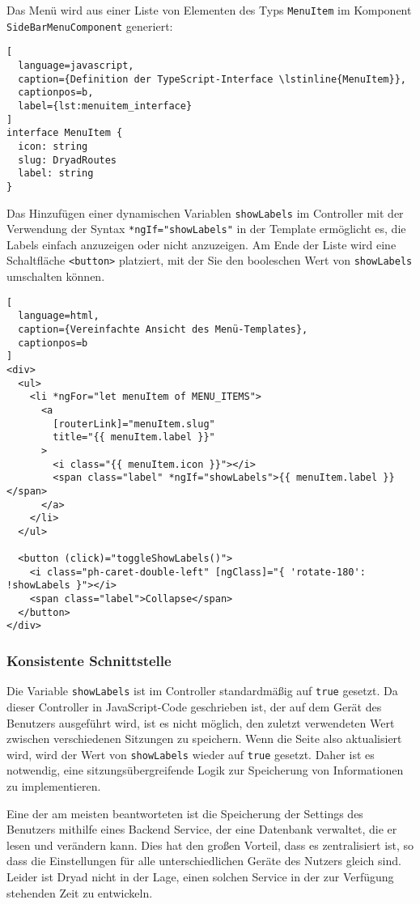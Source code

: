 Das Menü wird aus einer Liste von Elementen des Typs \lstinline{MenuItem} im Komponent \lstinline{SideBarMenuComponent} generiert:

\begin{lstlisting}[
  language=javascript,
  caption={Definition der TypeScript-Interface \lstinline{MenuItem}},
  captionpos=b,
  label={lst:menuitem_interface}
]
interface MenuItem {
  icon: string
  slug: DryadRoutes
  label: string
}
\end{lstlisting}

Das Hinzufügen einer dynamischen Variablen \lstinline{showLabels} im Controller mit der Verwendung der Syntax \lstinline{*ngIf="showLabels"} in der Template ermöglicht es, die Labels einfach anzuzeigen oder nicht anzuzeigen.
Am Ende der Liste wird eine Schaltfläche \lstinline{<button>} platziert, mit der Sie den booleschen Wert von \lstinline{showLabels} umschalten können.

\begin{lstlisting}[
  language=html,
  caption={Vereinfachte Ansicht des Menü-Templates},
  captionpos=b
]
<div>
  <ul>
    <li *ngFor="let menuItem of MENU_ITEMS">
      <a
        [routerLink]="menuItem.slug"
        title="{{ menuItem.label }}"
      >
        <i class="{{ menuItem.icon }}"></i>
        <span class="label" *ngIf="showLabels">{{ menuItem.label }}</span>
      </a>
    </li>
  </ul>

  <button (click)="toggleShowLabels()">
    <i class="ph-caret-double-left" [ngClass]="{ 'rotate-180': !showLabels }"></i>
    <span class="label">Collapse</span>
  </button>
</div>
\end{lstlisting}

\subsubsection{Konsistente Schnittstelle}

Die Variable \lstinline{showLabels} ist im Controller standardmäßig auf \lstinline{true} gesetzt.
Da dieser Controller in JavaScript-Code geschrieben ist, der auf dem Gerät des Benutzers ausgeführt wird, ist es nicht möglich, den zuletzt verwendeten Wert zwischen verschiedenen Sitzungen zu speichern.
Wenn die Seite also aktualisiert wird, wird der Wert von \lstinline{showLabels} wieder auf \lstinline{true} gesetzt.
Daher ist es notwendig, eine sitzungsübergreifende Logik zur Speicherung von Informationen zu implementieren.

Eine der am meisten beantworteten ist die Speicherung der Settings des Benutzers mithilfe eines Backend Service, der eine Datenbank verwaltet, die er lesen und verändern kann.
Dies hat den großen Vorteil, dass es zentralisiert ist, so dass die Einstellungen für alle unterschiedlichen Geräte des Nutzers gleich sind.
Leider ist Dryad nicht in der Lage, einen solchen Service in der zur Verfügung stehenden Zeit zu entwickeln.

